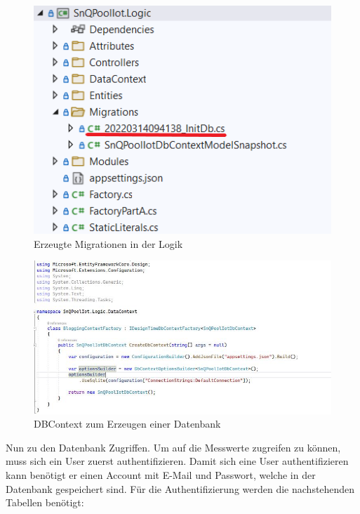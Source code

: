 \begin{figure}[H]
    \centering
    \includegraphics[width=1\textwidth]{pics/MigrationCreated.png}
    \caption{Erzeugte Migrationen in der Logik}
\end{figure}

\begin{figure}[H]
    \centering
    \includegraphics[width=1\textwidth]{pics/DBContext.JPG}
    \caption{DBContext zum Erzeugen einer Datenbank}
\end{figure}

Nun zu den Datenbank Zugriffen. Um auf die Messwerte zugreifen zu können, muss sich ein User zuerst authentifizieren.
Damit sich eine User authentifizieren kann benötigt er einen Account mit E-Mail und Passwort, welche in der Datenbank gespeichert sind.
Für die Authentifizierung werden die nachstehenden Tabellen benötigt:

